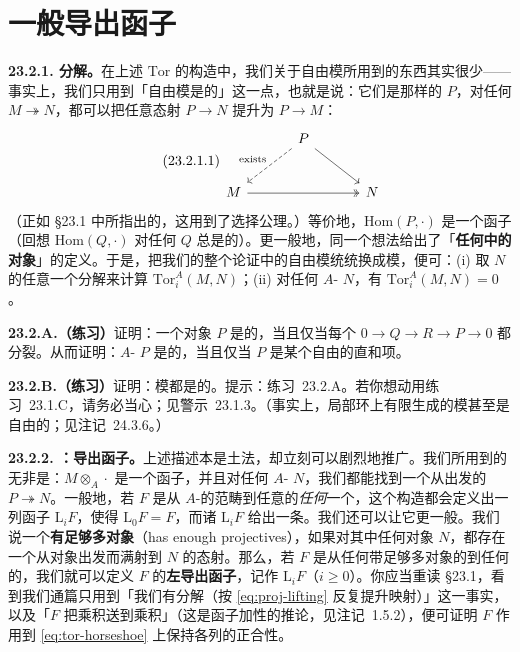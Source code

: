 
\section{一般导出函子}

\textbf{23.2.1. \trProjectiveObj{}分解。}\quad 在上述 $\mathrm{Tor}$ 的构造中，我们关于自由模所用到的东西其实很少——事实上，我们只用到「自由模是\textbf{\trProjectiveObj}的」这一点，也就是说：它们是那样的\trModule{} $P$，对任何\trSurjectiveMap{} $M\twoheadrightarrow N$，都可以把任意态射 $P\to N$ 提升为 $P\to M$：
\begin{equation*}\tag{23.2.1.1}\label{eq:proj-lifting}
\begin{tikzcd}[row sep=2.4em, column sep=3.2em]
 & P \ar[dl, "\text{exists}"', dashed] \ar[dr] & \\
M \ar[rr, two heads] & & N
\end{tikzcd}
\end{equation*}
（正如 \S23.1 中所指出的，这用到了选择公理。）等价地，$\mathrm{Hom}(P,\cdot)$ 是一个\trExact{}函子（回想 $\mathrm{Hom}(Q,\cdot)$ 对任何 $Q$ 总是\trLeftExact{}的）。更一般地，同一个想法给出了「\textbf{任何\trAbelianCategory{}中的\trProjectiveObj{}对象}」的定义。于是，把我们的整个论证中的自由模统统换成\trProjectiveObj{}模，便可：(i) 取 $N$ 的任意一个\trProjectiveObj{}分解来计算 $\mathrm{Tor}^A_i(M,N)$；(ii) 对任何\trProjectiveObj{} $A$-\trModule{} $N$，有 $\mathrm{Tor}^A_i(M,N)=0$。

\textbf{23.2.A.（练习）}\quad 证明：一个对象 $P$ 是\trProjectiveObj{}的，当且仅当每个\trShortExactSequence{} $0\to Q\to R\to P\to 0$ 都分裂。从而证明：$A$-\trModule{} $P$ 是\trProjectiveObj{}的，当且仅当 $P$ 是某个自由\trModule{}的直和项。

\textbf{23.2.B.（练习）}\quad 证明：\trProjectiveObj{}模都是\trFlat{}的。提示：\mbox{练习~23.2.A}。若你想动用\mbox{练习~23.1.C}，请务必当心；见\mbox{警示~23.1.3}。（事实上，局部环上有限生成的\trProjectiveObj{}模甚至是自由的；见\mbox{注记~24.3.6}。）

\textbf{23.2.2. \trhDefinition{}：导出函子。}\quad 上述描述本是土法，却立刻可以剧烈地推广。我们所用到的无非是：$M\otimes_A\cdot$ 是一个\trRightExact{}函子，并且对任何 $A$-\trModule{} $N$，我们都能找到一个从\trProjectiveObj{}\trModule{}出发的\trSurjectiveMap{} $P\twoheadrightarrow N$。一般地，若 $F$ 是从 $A$-\trModule{}的范畴到任意\trAbelianCategory{}的\emph{任何}一个\trRightExact{}\trCovariantFunctor，这个构造都会定义出一列函子 $\mathrm{L}_iF$，使得 $\mathrm{L}_0F=F$，而诸 $\mathrm{L}_iF$ 给出一条\trLongExactSequence。我们还可以让它更一般。我们说一个\trAbelianCategory{}\textbf{有足够多\trProjectiveObj{}对象}（has enough projectives），如果对其中任何对象 $N$，都存在一个从\trProjectiveObj{}对象出发而满射到 $N$ 的态射。那么，若 $F$ 是从任何带足够多\trProjectiveObj{}对象的\trAbelianCategory{}到任何\trAbelianCategory{}的\trRightExact{}\trCovariantFunctor，我们就可以定义 $F$ 的\textbf{左导出函子}，记作 $\mathrm{L}_iF$（$i\ge 0$）。你应当重读 \S23.1，看到我们通篇只用到「我们有\trProjectiveObj{}分解（按 \eqref{eq:proj-lifting} 反复提升映射）」这一事实，以及「$F$ 把乘积送到乘积」（这是函子加性的推论，见\mbox{注记~1.5.2}），便可证明 $F$ 作用到 \eqref{eq:tor-horseshoe} 上保持各列的正合性。

